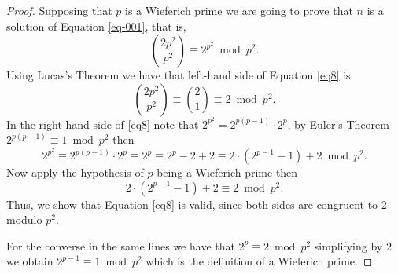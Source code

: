 \documentclass[11pt,a4paper]{article}
\begin{document}
\begin{proof}
Supposing that $p$ is a Wieferich prime we are going to prove that $n$ is a solution of Equation \eqref{eq-001}, that is,
\begin{equation}\label{eq8}
\binom{2p^2}{p^2}\equiv2^{p^2} \bmod {p^2}.
\end{equation}
Using Lucas's Theorem  we have that left-hand side of Equation \eqref{eq8} is
$$\binom{2p^2}{p^2}\equiv\binom{2}{1}\equiv 2 \bmod {p^2}.$$ In the right-hand side of \eqref{eq8} note that
$2^{p^2}=2^{p(p-1)}\cdot2^p$,
by Euler's Theorem 
$2^{p(p-1)}\equiv 1 \bmod {p^2}$
then 
$$2^{p^2}\equiv2^{p(p-1)}\cdot2^p\equiv2^p\equiv2^p -2 +2\equiv 2\cdot(2^{p-1}-1) +2 \bmod {p^2}.$$
Now apply the hypothesis of $p$ being a Wieferich prime then
$$2\cdot(2^{p-1}-1) +2\equiv 2 \bmod {p^2.}$$
Thus, we show that Equation \eqref{eq8} is valid, since both sides are congruent to $2$ modulo $p^2$.


For the converse in the same lines we have that
$2^p\equiv 2 \bmod p^2$
simplifying by $2$ we obtain
$2^{p-1}\equiv 1 \bmod {p^2}$
which %
is the definition of a Wieferich prime.
\end{proof}
\end{document}
